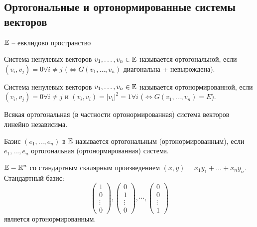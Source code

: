 \subsection*{Ортогональные и ортонормированные системы векторов}
%

$\mathbb{E}$ -- евклидово пространство
\begin{Def}
  Система ненулевых векторов $v_1, \ldots, v_n \in \mathbb{E}$ называется ортогональной, если $(v_i, v_j) = 0 \forall i \ne j$ ($\iff G(v_1, \ldots, v_n)$ диагональна + невырождена).
\end{Def}

\begin{Def}
  Система ненулевых векторов $v_1, \ldots, v_n \in \mathbb{E}$ называется ортонормированной, если $(v_i, v_j) = 0 \forall i \ne j$ и $(v_i, v_i) = |v_i|^2 = 1 \forall i$ ($\iff G(v_1, \ldots, v_n) = E$).
\end{Def}

\begin{Note}
  Всякая ортогональная (в частности ортонормированная) система векторов линейно независима.
\end{Note}

\begin{Def}
  Базис $(e_1, \ldots, e_n)$ в $\mathbb{E}$ называется ортогональным (ортонормированным), если $e_1, \ldots, e_n$ ортогональная (ортонормированная) система.
\end{Def}

\begin{Examples}
  $\mathbb{E} = \mathbb{R}^n$ со стандартным скалярным произведением $(x, y) = x_1y_1 + \ldots + x_ny_n$. Стандартный базис:
  \[
  \begin{pmatrix}
    1 \\
    0 \\
    \vdots \\
    0
  \end{pmatrix}, 
  \begin{pmatrix}
    0 \\
    1 \\
    \vdots \\
    0
  \end{pmatrix}, \cdots, 
  \begin{pmatrix}
    0 \\
    0 \\
    \vdots \\
    1
  \end{pmatrix}
  \]
  является ортонормированным.
\end{Examples}

